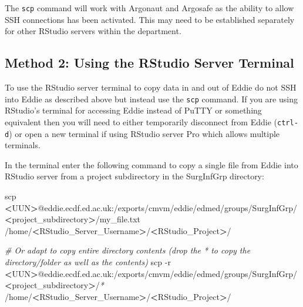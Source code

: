 \documentclass[
]{book}
\newenvironment{Shaded}{\begin{snugshade}}{\end{snugshade}}
\newcommand{\AttributeTok}[1]{\textcolor[rgb]{0.77,0.63,0.00}{#1}}
\newcommand{\CommentTok}[1]{\textcolor[rgb]{0.56,0.35,0.01}{\textit{#1}}}
\newcommand{\FunctionTok}[1]{\textcolor[rgb]{0.00,0.00,0.00}{#1}}
\newcommand{\NormalTok}[1]{#1}
\newcommand{\OperatorTok}[1]{\textcolor[rgb]{0.81,0.36,0.00}{\textbf{#1}}}
\newcommand{\PreprocessorTok}[1]{\textcolor[rgb]{0.56,0.35,0.01}{\textit{#1}}}
\begin{document}
The \texttt{scp} command will work with Argonaut and Argosafe as the ability to allow SSH connections has been activated. This may need to be established separately for other RStudio servers within the department.

\hypertarget{method-2-using-the-rstudio-server-terminal}{%
\subsection{Method 2: Using the RStudio Server Terminal}\label{method-2-using-the-rstudio-server-terminal}}

To use the RStudio server terminal to copy data in and out of Eddie do not SSH into Eddie as described above but instead use the \texttt{scp} command. If you are using RStudio's terminal for accessing Eddie instead of PuTTY or something equivalent then you will need to either temporarily disconnect from Eddie (\texttt{ctrl-d}) or open a new terminal if using RStudio server Pro which allows multiple terminals.

In the terminal enter the following command to copy a single file from Eddie into RStudio server from a project subdirectory in the SurgInfGrp directory:

\begin{Shaded}
\begin{Highlighting}[]
\FunctionTok{scp} \OperatorTok{\textless{}}\NormalTok{UUN}\OperatorTok{\textgreater{}}\NormalTok{@eddie.ecdf.ed.ac.uk:/exports/cmvm/eddie/edmed/groups/SurgInfGrp/}\OperatorTok{\textless{}}\NormalTok{project\_subdirectory}\OperatorTok{\textgreater{}}\NormalTok{/my\_file.txt /home/}\OperatorTok{\textless{}}\NormalTok{RStudio\_Server\_Username}\OperatorTok{\textgreater{}}\NormalTok{/}\OperatorTok{\textless{}}\NormalTok{RStudio\_Project}\OperatorTok{\textgreater{}}\NormalTok{/}

\CommentTok{\# Or adapt to copy entire directory contents (drop the * to copy the directory/folder as well as the contents)}
\FunctionTok{scp} \AttributeTok{{-}r} \OperatorTok{\textless{}}\NormalTok{UUN}\OperatorTok{\textgreater{}}\NormalTok{@eddie.ecdf.ed.ac.uk:/exports/cmvm/eddie/edmed/groups/SurgInfGrp/}\OperatorTok{\textless{}}\NormalTok{project\_subdirectory}\OperatorTok{\textgreater{}}\NormalTok{/}\PreprocessorTok{*}\NormalTok{ /home/}\OperatorTok{\textless{}}\NormalTok{RStudio\_Server\_Username}\OperatorTok{\textgreater{}}\NormalTok{/}\OperatorTok{\textless{}}\NormalTok{RStudio\_Project}\OperatorTok{\textgreater{}}\NormalTok{/}
\end{Highlighting}
\end{Shaded}
\end{document}
